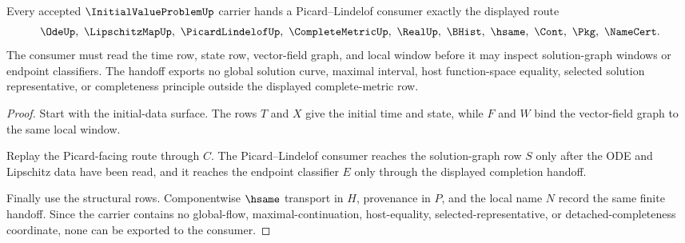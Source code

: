 \begin{theorem}
\label{thm:initial-value-problem-picard-handoff}
Every accepted $\InitialValueProblemUp$ carrier hands a Picard--Lindelof consumer exactly the displayed route
$$
\OdeUp,\ \LipschitzMapUp,\ \PicardLindelofUp,\ \CompleteMetricUp,\ \RealUp,\ \BHist,\ \hsame,\ \Cont,\ \Pkg,\ \NameCert .
$$
The consumer must read the time row, state row, vector-field graph, and local window before it may inspect solution-graph windows or endpoint classifiers. The handoff exports no global solution curve, maximal interval, host function-space equality, selected solution representative, or completeness principle outside the displayed complete-metric row.
\end{theorem}
\begin{proof}
Start with the initial-data surface. The rows $T$ and $X$ give the initial time and state, while $F$ and $W$ bind the vector-field graph to the same local window.

Replay the Picard-facing route through $C$. The Picard--Lindelof consumer reaches the solution-graph row $S$ only after the ODE and Lipschitz data have been read, and it reaches the endpoint classifier $E$ only through the displayed completion handoff.

Finally use the structural rows. Componentwise $\hsame$ transport in $H$, provenance in $P$, and the local name $N$ record the same finite handoff. Since the carrier contains no global-flow, maximal-continuation, host-equality, selected-representative, or detached-completeness coordinate, none can be exported to the consumer.
\end{proof}


\begin{closurestatus}{\InitialValueProblemUp}
  \theoryclosure{\seedClosure}
  \formalstatus{\unformalizedV}
\end{closurestatus}
